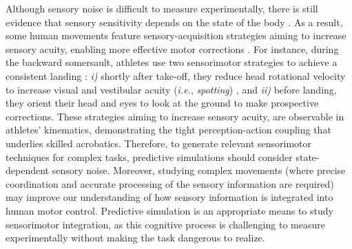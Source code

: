 \documentclass[10pt,letterpaper]{article}
\begin{document}
Although sensory noise is difficult to measure experimentally, there is still evidence that sensory sensitivity depends on the state of the body \cite{mallery2010human, demer1993dynamic, kaptein2004interpretation}.
As a result, some human movements feature sensory-acquisition strategies aiming to increase sensory acuity, enabling more effective motor corrections \cite{yeo2016optimal}.
For instance, during the backward somersault, athletes use two sensorimotor strategies to achieve a consistent landing \cite{bardy1998body}: \textit{i)} shortly after take-off, they reduce head rotational velocity to increase visual and vestibular acuity (\textit{i.e.}, \textit{spotting}) \cite{davlin2004gymnasts}, and \textit{ii)} before landing, they orient their head and eyes to look at the ground to make prospective corrections.
These strategies aiming to increase sensory acuity, are observable in athletes' kinematics, demonstrating the tight perception-action coupling that underlies skilled acrobatics.
Therefore, to generate relevant sensorimotor techniques for complex tasks, predictive simulations should consider state-dependent sensory noise.
Moreover, studying complex movements (where precise coordination and accurate processing of the sensory information are required) may improve our understanding of how sensory information is integrated into human motor control.
Predictive simulation is an appropriate means to study sensorimotor integration, as this cognitive process is challenging to measure experimentally without making the task dangerous to realize.
\end{document}
